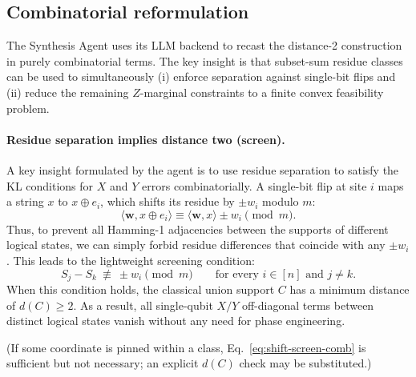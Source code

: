 \documentclass[pdflatex,sn-nature]{sn-jnl}%
\theoremstyle{thmstyleone}%
\theoremstyle{thmstyletwo}%
\theoremstyle{thmstylethree}%
\begin{document}
\subsection{Combinatorial reformulation}
\label{subsec:comb}
The Synthesis Agent uses its LLM backend to recast the distance-2 construction in purely combinatorial terms. The key insight is that subset-sum residue classes can be used to simultaneously (i) enforce separation against single-bit flips and (ii) reduce the remaining $Z$-marginal constraints to a finite convex feasibility problem.

\paragraph{Residue separation implies distance two (screen).}
A key insight formulated by the agent is to use residue separation to satisfy the KL conditions for $X$ and $Y$ errors combinatorially. A single-bit flip at site $i$ maps a string $x$ to $x\oplus e_i$, which shifts its residue by $\pm w_i$ modulo $m$:
\[
    \langle \mathbf w, x\oplus e_i\rangle \equiv \langle \mathbf w, x\rangle \pm w_i \pmod m.
\]
Thus, to prevent all Hamming-1 adjacencies between the supports of different logical states, we can simply forbid residue differences that coincide with any $\pm w_i$. This leads to the lightweight screening condition:
\begin{equation}
    \label{eq:shift-screen-comb}
    S_j - S_k \ \not\equiv\ \pm w_i \pmod m \qquad \text{for every } i\in[n] \text{ and } j\neq k.
\end{equation}
When this condition holds, the classical union support $C$ has a minimum distance of $d(C)\ge 2$. As a result, all single-qubit $X/Y$ off-diagonal terms between distinct logical states vanish without any need for phase engineering.

(If some coordinate is pinned within a class, Eq.~\eqref{eq:shift-screen-comb} is sufficient but not necessary; an explicit $d(C)$ check may be substituted.)
\end{document}
